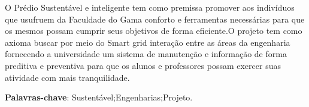 \begin{resumo}
 O Prédio Sustentável e inteligente tem como premissa promover aos indivíduos que usufruem da Faculdade do Gama conforto e ferramentas necessárias para que os mesmos possam cumprir seus objetivos de forma eficiente.O projeto tem como axioma buscar por meio do Smart grid interação entre as áreas da engenharia fornecendo a universidade um sistema de manutenção e informação de forma preditiva e preventiva para que os alunos e professores possam exercer suas atividade com mais tranquilidade.


 \vspace{\onelineskip}
    
 \noindent
 \textbf{Palavras-chave}: Sustentável;Engenharias;Projeto.
\end{resumo}
